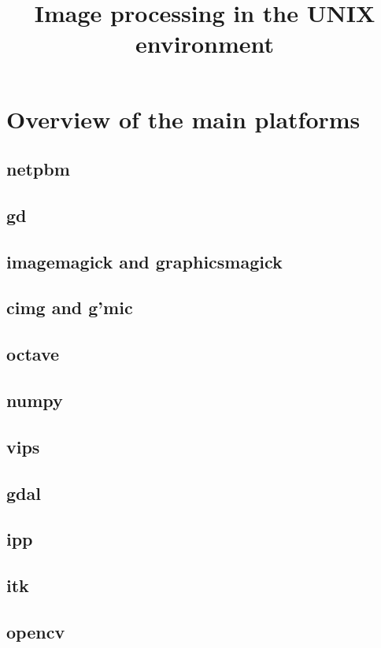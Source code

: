 \title{Image processing in the UNIX environment}

\section{Overview of the main platforms}

\subsection{netpbm}

\subsection{gd}

\subsection{imagemagick and graphicsmagick}

\subsection{cimg and g'mic}

\subsection{octave}

\subsection{numpy}

\subsection{vips}

\subsection{gdal}

\subsection{ipp}

\subsection{itk}

\subsection{opencv}

